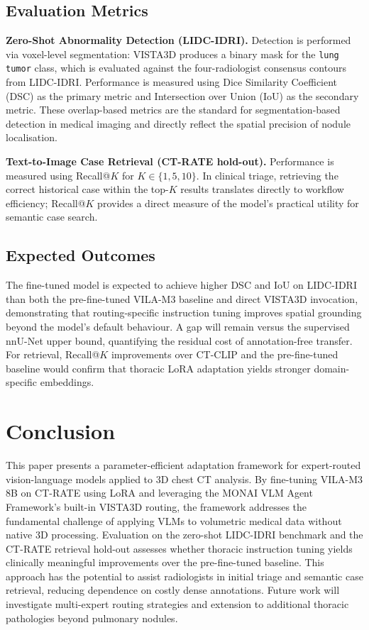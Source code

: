 \documentclass{iopconfser}
\begin{document}
\subsection{Evaluation Metrics}

\textbf{Zero-Shot Abnormality Detection (LIDC-IDRI).}
Detection is performed via voxel-level segmentation: VISTA3D produces a
binary mask for the \texttt{lung tumor} class, which is evaluated against
the four-radiologist consensus contours from LIDC-IDRI. Performance is
measured using Dice Similarity Coefficient (DSC) as the primary metric and
Intersection over Union (IoU) as the secondary metric. These overlap-based
metrics are the standard for segmentation-based detection in medical imaging
and directly reflect the spatial precision of nodule localisation.

\textbf{Text-to-Image Case Retrieval (CT-RATE hold-out).}
Performance is measured using Recall@$K$ for $K \in \{1, 5, 10\}$. In clinical
triage, retrieving the correct historical case within the top-$K$ results
translates directly to workflow efficiency; Recall@$K$ provides a direct measure
of the model's practical utility for semantic case search.

\subsection{Expected Outcomes}

The fine-tuned model is expected to achieve higher DSC and IoU on LIDC-IDRI
than both the pre-fine-tuned VILA-M3 baseline and direct VISTA3D invocation,
demonstrating that routing-specific instruction tuning improves spatial
grounding beyond the model's default behaviour. A gap will remain versus the
supervised nnU-Net upper bound, quantifying the residual cost of
annotation-free transfer. For retrieval, Recall@$K$ improvements over CT-CLIP
and the pre-fine-tuned baseline would confirm that thoracic LoRA adaptation
yields stronger domain-specific embeddings.


\section{Conclusion}

This paper presents a parameter-efficient adaptation framework for expert-routed
vision-language models applied to 3D chest CT analysis. By fine-tuning VILA-M3 8B
on CT-RATE using LoRA and leveraging the MONAI VLM Agent Framework's built-in
VISTA3D routing, the framework addresses the fundamental challenge of applying
VLMs to volumetric medical data without native 3D processing. Evaluation on the
zero-shot LIDC-IDRI benchmark and the CT-RATE retrieval hold-out assesses
whether thoracic instruction tuning yields clinically meaningful improvements
over the pre-fine-tuned baseline. This approach has the potential to assist
radiologists in initial triage and semantic case retrieval, reducing dependence
on costly dense annotations. Future work will investigate multi-expert routing
strategies and extension to additional thoracic pathologies beyond pulmonary
nodules.
\end{document}
